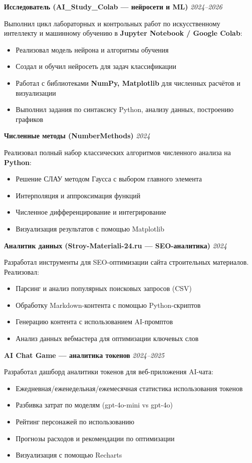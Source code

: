 \documentclass[10pt,a4paper]{article}
\newcommand{\projectEntry}[3]{\textbf{#1} \hfill \textit{#2}\par #3\par\vspace{0.3em}}
\begin{document}
\projectEntry{Исследователь (AI\_Study\_Colab — нейросети и ML)}{2024–2026}
{Выполнил цикл лабораторных и контрольных работ по искусственному интеллекту и машинному обучению в \textbf{Jupyter Notebook / Google Colab}:
\begin{itemize}
    \item Реализовал модель нейрона и алгоритмы обучения
    \item Создал и обучил нейросеть для задач классификации
    \item Работал с библиотеками \textbf{NumPy, Matplotlib} для численных расчётов и визуализации
    \item Выполнил задания по синтаксису Python, анализу данных, построению графиков
\end{itemize}}

\projectEntry{Численные методы (NumberMethods)}{2024}
{Реализовал полный набор классических алгоритмов численного анализа на \textbf{Python}:
\begin{itemize}
    \item Решение СЛАУ методом Гаусса с выбором главного элемента
    \item Интерполяция и аппроксимация функций
    \item Численное дифференцирование и интегрирование
    \item Визуализация результатов с помощью Matplotlib
\end{itemize}}

\projectEntry{Аналитик данных (Stroy-Materiali-24.ru — SEO-аналитика)}{2024}
{Разработал инструменты для SEO-оптимизации сайта строительных материалов. Реализовал:
\begin{itemize}
    \item Парсинг и анализ популярных поисковых запросов (CSV)
    \item Обработку Markdown-контента с помощью Python-скриптов
    \item Генерацию контента с использованием AI-промптов
    \item Анализ данных вебмастера для оптимизации ключевых слов
\end{itemize}}

\projectEntry{AI Chat Game — аналитика токенов}{2024–2025}
{Разработал дашборд аналитики токенов для веб-приложения AI-чата:
\begin{itemize}
    \item Ежедневная/еженедельная/ежемесячная статистика использования токенов
    \item Разбивка затрат по моделям (gpt-4o-mini vs gpt-4o)
    \item Рейтинг персонажей по использованию
    \item Прогнозы расходов и рекомендации по оптимизации
    \item Визуализация с помощью Recharts
\end{itemize}}
\end{document}
